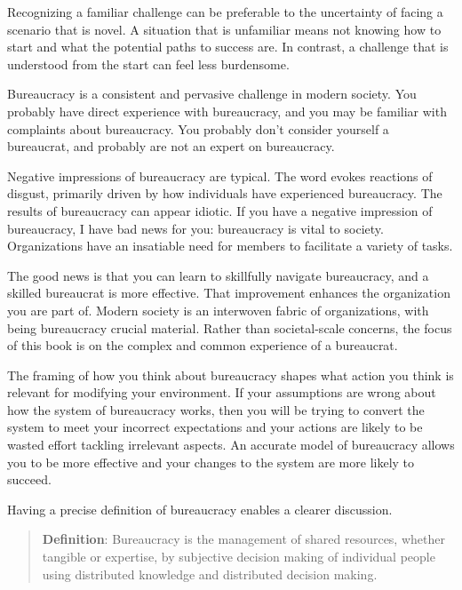 

Recognizing a familiar challenge can be preferable to the uncertainty of facing a scenario that is novel. A situation that is unfamiliar means not knowing how to start and what the potential paths to success are. In contrast, a challenge that is understood from the start can feel less burdensome. 

Bureaucracy is a consistent and pervasive challenge in modern society. You probably have direct experience with bureaucracy, and you may be familiar with complaints about bureaucracy. You probably don't consider yourself a bureaucrat, and probably are not an expert on bureaucracy.


Negative impressions of bureaucracy are typical. The word 
evokes reactions of disgust, primarily driven by how individuals have experienced bureaucracy.
The results of bureaucracy can appear idiotic.
If you have a negative impression of bureaucracy, I have bad news for you: bureaucracy is vital to society. 
Organizations have an insatiable need for members to facilitate a variety of tasks.

The good news is that you can learn to skillfully navigate bureaucracy, and a skilled bureaucrat is more effective. That improvement enhances the organization you are part of. Modern society is an interwoven fabric of organizations, with being bureaucracy crucial material.
Rather than societal-scale concerns, the focus of this book is on the complex and common experience of a bureaucrat. 


The framing of how you think about bureaucracy shapes what action you think is relevant for modifying your environment. 
If your assumptions are wrong about how the system of bureaucracy works, then you will be trying to convert the system to meet your incorrect expectations and your actions are likely to be wasted effort tackling irrelevant aspects. 
An accurate model of bureaucracy allows you to be more effective and your changes to the system are more likely to succeed. 

Having a precise definition of bureaucracy enables a clearer discussion. 
\begin{quote}
\textbf{Definition}: Bureaucracy is the management of shared resources, whether tangible or expertise, by subjective decision making of individual people using distributed knowledge and distributed decision making. 
\end{quote}

